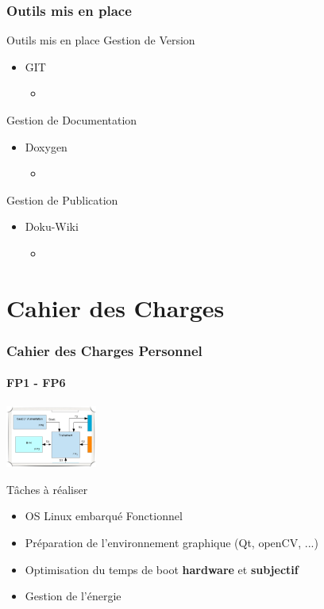 \documentclass[11pt]{beamer}
\begin{document}
	\subsubsection[]{Outils mis en place}
	\begin{frame}{Outils mis en place}
	Gestion de Version
	\begin{itemize}
	 \item GIT 
	      \begin{itemize}
	      \item \href{https://github.com/estei-master/segment_SOL}{}
	      \end{itemize}
	 \end{itemize}
	 Gestion de Documentation
	 \begin{itemize}
	 \item Doxygen 
	      \begin{itemize}
	      \item \href{http://78.231.214.8/ihm2/html/}{}
	      \end{itemize}
	  \end{itemize}
	  Gestion de Publication 
	  \begin{itemize}
	 \item Doku-Wiki 
	    \begin{itemize}
	    \item \href{http://78.231.214.8/dokuwiki/doku.php}{}
	    \end{itemize}
	\end{itemize}
	
	\end{frame}
	
	
	\section{Cahier des Charges}
	\begin{frame}
		\frametitle{Cahier des Charges Personnel}
		\framesubtitle{FP1 - FP6}
		\begin{center}
				\includegraphics[width=3cm]{common/cdcperso.png}	\\ 
		\end{center}
	\begin{block}{Tâches à réaliser}
		\begin{itemize}
			\item OS Linux embarqué Fonctionnel
			\item Préparation de l'environnement graphique (Qt, openCV, ...)
			\item Optimisation du temps de boot \textbf<2>{hardware} et \textbf<2>{subjectif}
			\item Gestion de l'énergie
		\end{itemize}
	\end{block}
	\end{frame}
	
\end{document}
